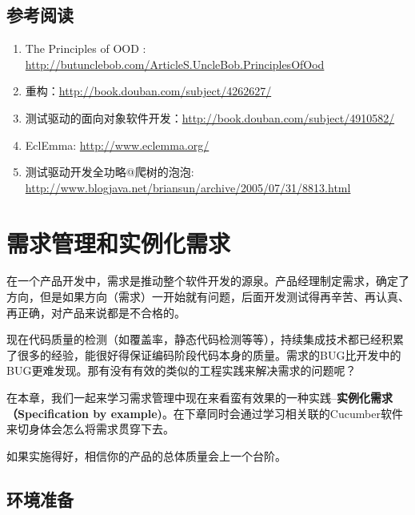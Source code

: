 \section{参考阅读}
\label{参考阅读}

\begin{enumerate}
\item The Principles of OOD : \href{http://butunclebob.com/ArticleS.UncleBob.PrinciplesOfOod}{http:/\slash butunclebob.com\slash ArticleS.UncleBob.PrinciplesOfOod}

\item 重构：\href{http://book.douban.com/subject/4262627/}{http:/\slash book.douban.com\slash subject\slash 4262627\slash }

\item 测试驱动的面向对象软件开发：\href{http://book.douban.com/subject/4910582/}{http:/\slash book.douban.com\slash subject\slash 4910582\slash }

\item EclEmma: \href{http://www.eclemma.org/}{http:/\slash www.eclemma.org\slash }

\item 测试驱动开发全功略@爬树的泡泡: \href{http://www.blogjava.net/briansun/archive/2005/07/31/8813.html}{http:/\slash www.blogjava.net\slash briansun\slash archive\slash 2005\slash 07\slash 31\slash 8813.html}

\end{enumerate}

\chapter{需求管理和实例化需求}
\label{需求管理和实例化需求}

在一个产品开发中，需求是推动整个软件开发的源泉。产品经理制定需求，确定了方向，但是如果方向（需求）一开始就有问题，后面开发测试得再辛苦、再认真、再正确，对产品来说都是不合格的。

现在代码质量的检测（如覆盖率，静态代码检测等等），持续集成技术都已经积累了很多的经验，能很好得保证编码阶段代码本身的质量。需求的BUG比开发中的BUG更难发现。那有没有有效的类似的工程实践来解决需求的问题呢？

在本章，我们一起来学习需求管理中现在来看蛮有效果的一种实践--\textbf{实例化需求（Specification by example)}。在下章同时会通过学习相关联的Cucumber软件来切身体会怎么将需求贯穿下去。

如果实施得好，相信你的产品的总体质量会上一个台阶。

\section{环境准备}
\label{环境准备}

